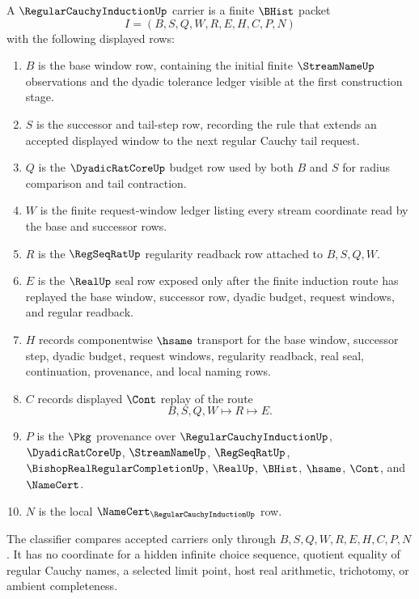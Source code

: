 \begin{definition}
\label{def:regular-cauchy-induction-carrier}
A $\RegularCauchyInductionUp$ carrier is a finite $\BHist$ packet
$$
I=(B,S,Q,W,R,E,H,C,P,N)
$$
with the following displayed rows:
\begin{enumerate}
\item $B$ is the base window row, containing the initial finite $\StreamNameUp$ observations and the dyadic tolerance ledger visible at the first construction stage.
\item $S$ is the successor and tail-step row, recording the rule that extends an accepted displayed window to the next regular Cauchy tail request.
\item $Q$ is the $\DyadicRatCoreUp$ budget row used by both $B$ and $S$ for radius comparison and tail contraction.
\item $W$ is the finite request-window ledger listing every stream coordinate read by the base and successor rows.
\item $R$ is the $\RegSeqRatUp$ regularity readback row attached to $B,S,Q,W$.
\item $E$ is the $\RealUp$ seal row exposed only after the finite induction route has replayed the base window, successor row, dyadic budget, request windows, and regular readback.
\item $H$ records componentwise $\hsame$ transport for the base window, successor step, dyadic budget, request windows, regularity readback, real seal, continuation, provenance, and local naming rows.
\item $C$ records displayed $\Cont$ replay of the route
$$
B,S,Q,W \longmapsto R \longmapsto E .
$$
\item $P$ is the $\Pkg$ provenance over $\RegularCauchyInductionUp$, $\DyadicRatCoreUp$, $\StreamNameUp$, $\RegSeqRatUp$, $\BishopRealRegularCompletionUp$, $\RealUp$, $\BHist$, $\hsame$, $\Cont$, and $\NameCert$.
\item $N$ is the local $\NameCert_{\RegularCauchyInductionUp}$ row.
\end{enumerate}
The classifier compares accepted carriers only through $B,S,Q,W,R,E,H,C,P,N$. It has no coordinate for a hidden infinite choice sequence, quotient equality of regular Cauchy names, a selected limit point, host real arithmetic, trichotomy, or ambient completeness.
\end{definition}

